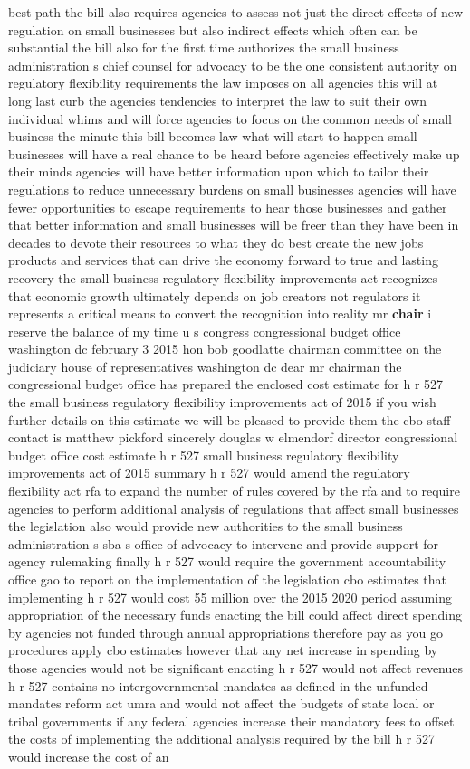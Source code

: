 \documentclass{article}
\begin{document}
best path the bill also requires agencies to assess not just the direct effects of new regulation on small businesses but also indirect effects which often can be substantial the bill also for the first time authorizes the small business administration s chief counsel for advocacy to be the one consistent authority on regulatory flexibility requirements the law imposes on all agencies this will at long last curb the agencies tendencies to interpret the law to suit their own individual whims and will force agencies to focus on the common needs of small business the minute this bill becomes law what will start to happen small businesses will have a real chance to be heard before agencies effectively make up their minds agencies will have better information upon which to tailor their regulations to reduce unnecessary burdens on small businesses agencies will have fewer opportunities to escape requirements to hear those businesses and gather that better information and small businesses will be freer than they have been in decades to devote their resources to what they do best create the new jobs products and services that can drive the economy forward to true and lasting recovery the small business regulatory flexibility improvements act recognizes that economic growth ultimately depends on job creators not regulators it represents a critical means to convert the recognition into reality mr {\bf \color{red} chair} i reserve the balance of my time u s congress congressional budget office washington dc february 3 2015 hon bob goodlatte chairman committee on the judiciary house of representatives washington dc dear mr chairman the congressional budget office has prepared the enclosed cost estimate for h r 527 the small business regulatory flexibility improvements act of 2015 if you wish further details on this estimate we will be pleased to provide them the cbo staff contact is matthew pickford sincerely douglas w elmendorf director congressional budget office cost estimate h r 527 small business regulatory flexibility improvements act of 2015 summary h r 527 would amend the regulatory flexibility act rfa to expand the number of rules covered by the rfa and to require agencies to perform additional analysis of regulations that affect small businesses the legislation also would provide new authorities to the small business administration s sba s office of advocacy to intervene and provide support for agency rulemaking finally h r 527 would require the government accountability office gao to report on the implementation of the legislation cbo estimates that implementing h r 527 would cost 55 million over the 2015 2020 period assuming appropriation of the necessary funds enacting the bill could affect direct spending by agencies not funded through annual appropriations therefore pay as you go procedures apply cbo estimates however that any net increase in spending by those agencies would not be significant enacting h r 527 would not affect revenues h r 527 contains no intergovernmental mandates as defined in the unfunded mandates reform act umra and would not affect the budgets of state local or tribal governments if any federal agencies increase their mandatory fees to offset the costs of implementing the additional analysis required by the bill h r 527 would increase the cost of an 
\end{document}
